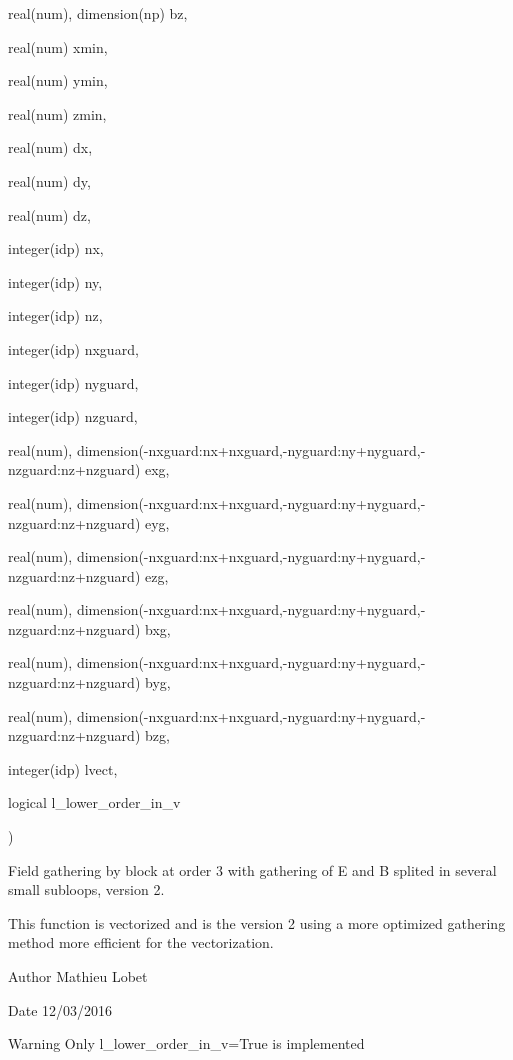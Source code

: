 {\begin{DoxyParamCaption}
\item[{real(num), dimension(np)}]{bz, }
\item[{real(num)}]{xmin, }
\item[{real(num)}]{ymin, }
\item[{real(num)}]{zmin, }
\item[{real(num)}]{dx, }
\item[{real(num)}]{dy, }
\item[{real(num)}]{dz, }
\item[{integer(idp)}]{nx, }
\item[{integer(idp)}]{ny, }
\item[{integer(idp)}]{nz, }
\item[{integer(idp)}]{nxguard, }
\item[{integer(idp)}]{nyguard, }
\item[{integer(idp)}]{nzguard, }
\item[{real(num), dimension(-\/nxguard\+:nx+nxguard,-\/nyguard\+:ny+nyguard,-\/nzguard\+:nz+nzguard)}]{exg, }
\item[{real(num), dimension(-\/nxguard\+:nx+nxguard,-\/nyguard\+:ny+nyguard,-\/nzguard\+:nz+nzguard)}]{eyg, }
\item[{real(num), dimension(-\/nxguard\+:nx+nxguard,-\/nyguard\+:ny+nyguard,-\/nzguard\+:nz+nzguard)}]{ezg, }
\item[{real(num), dimension(-\/nxguard\+:nx+nxguard,-\/nyguard\+:ny+nyguard,-\/nzguard\+:nz+nzguard)}]{bxg, }
\item[{real(num), dimension(-\/nxguard\+:nx+nxguard,-\/nyguard\+:ny+nyguard,-\/nzguard\+:nz+nzguard)}]{byg, }
\item[{real(num), dimension(-\/nxguard\+:nx+nxguard,-\/nyguard\+:ny+nyguard,-\/nzguard\+:nz+nzguard)}]{bzg, }
\item[{integer(idp)}]{lvect, }
\item[{logical}]{l\+\_\+lower\+\_\+order\+\_\+in\+\_\+v}
\end{DoxyParamCaption}
)}\hypertarget{field__gathering__3d__o3_8_f90_aa724510149f9ad46a950d576006e248f}{}\label{field__gathering__3d__o3_8_f90_aa724510149f9ad46a950d576006e248f}


Field gathering by block at order 3 with gathering of E and B splited in several small subloops, version 2. 

This function is vectorized and is the version 2 using a more optimized gathering method more efficient for the vectorization. \begin{DoxyAuthor}{Author}
Mathieu Lobet 
\end{DoxyAuthor}
\begin{DoxyDate}{Date}
12/03/2016 
\end{DoxyDate}
\begin{DoxyWarning}{Warning}
Only l\+\_\+lower\+\_\+order\+\_\+in\+\_\+v=True is implemented 
\end{DoxyWarning}

